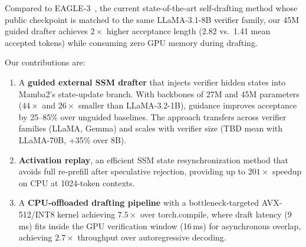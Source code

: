 Compared to EAGLE-3~\citep{li2024eagle3}, the current state-of-the-art self-drafting method whose public checkpoint is matched to the same LLaMA-3.1-8B verifier family, our 45M guided drafter achieves $2\times$ higher acceptance length (2.82 vs.\ 1.41 mean accepted tokens) while consuming zero GPU memory during drafting.

Our contributions are:
\begin{enumerate}
    \item A \textbf{guided external SSM drafter} that injects verifier hidden states into Mamba2's state-update branch. With backbones of 27M and 45M parameters ($44\times$ and $26\times$ smaller than LLaMA-3.2-1B), guidance improves acceptance by 25--85\% over unguided baselines. The approach transfers across verifier families (LLaMA, Gemma) and scales with verifier size (TBD mean with LLaMA-70B, +35\% over 8B).
    \item \textbf{Activation replay}, an efficient SSM state resynchronization method that avoids full re-prefill after speculative rejection, providing up to $201\times$ speedup on CPU at 1024-token contexts.
    \item A \textbf{CPU-offloaded drafting pipeline} with a bottleneck-targeted AVX-512/INT8 kernel achieving $7.5\times$ over torch.compile, where draft latency (9\,ms) fits inside the GPU verification window (16\,ms) for asynchronous overlap, achieving $2.7\times$ throughput over autoregressive decoding.
\end{enumerate}
